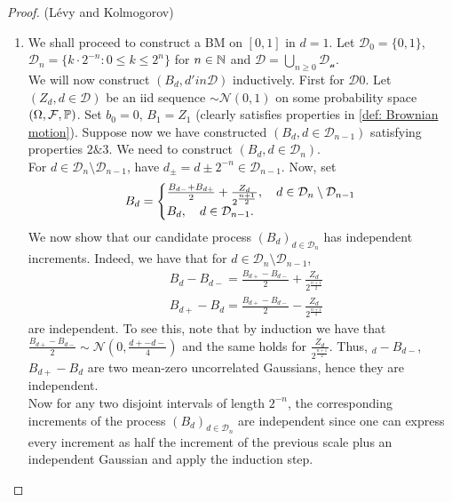 \documentclass{article}
\begin{document}
\begin{proof}{(L\'{e}vy and Kolmogorov)}

    \begin{enumerate}
	    \item We shall proceed to construct a BM on $ [0,1]$ in $ d = 1$. Let $ \mathcal{D}_{0} = \{0,1\}$, $ \mathcal{D}_{n} = \{k\cdot 2^{-n}: 0\leq k \leq 2^n\}$ for $ n\in \mathbb{N}$ and $ \mathcal{D} = \displaystyle\bigcup_{n\geq 0} \mathcal{D_{n}}$.\\ 

		    We will now construct $ (B_{d}, d'in \mathcal{D})$ inductively. First for $ \mathcal{D}0$. Let $ (Z_{d}, d\in \mathcal{D})$ be an iid sequence $ \sim \mathcal{N}(0,1)$ on some probability space $ (\Omega, \mathcal{F}, \mathbb{P})$. Set $ b_{0} = 0$, $ B_{1} = Z_{1}$ (clearly satisfies properties in \ref{def: Brownian motion}). Suppose now we have constructed $ (B_{d}, d\in \mathcal{D}_{n-1})$ satisfying properties $ 2 \& 3$. We need to construct $ (B_{d}, d\in \mathcal{D}_{n})$.\\ 

		    For $ d\in \mathcal{D}_{n}\setminus \mathcal{D}_{n-1}$, have $d_{\pm} = d\pm 2^{-n}\in \mathcal{D}_{n-1}$. Now, set
		    \[
	 B_{d} =   \left\lbrace
		    \begin{array}{@{}l@{}}
		       \frac{B_{d-}+B_{d+}}{2}+\frac{Z_{d}}{2^{\frac{n+1}{2}}}, \quad d\in \mathcal{D}_{n}\setminus \mathcal{D}_{n-1} \\
		        B_{d}, \quad d\in \mathcal{D}_{n-1}.
		    \end{array}\right.
		    \]
		   We now show that our candidate process $ (B_{d})_{d\in \mathcal{D}_{n}}$ has independent increments. Indeed, we have that for $ d\in \mathcal{D}_{n}\setminus \mathcal{D}_{n-1}$,
		   \[
			   \begin{array}{cc}
		       &B_{d}-B_{d-} = \frac{B_{d+}-B_{d-}}{2}+\frac{Z_{d}}{2^{\frac{n+1}{2}}}\\ 
		       &B_{d+}-B_{d} = \frac{B_{d+}-B_{d-}}{2}-\frac{Z_{d}}{2^{\frac{n+1}{2}}}
		   \end{array}		   
		   \]
		   are independent. To see this, note that by induction we have that $\frac{B_{d+}-B_{d-}}{2}\sim \mathcal{N}(0, \frac{d+-d-}{4})$ and the same holds for $ \frac{Z_{d}}{2^{\frac{n+1}{2}}}$. Thus, $ _{d}-B_{d-}$, $B_{d+}-B_{d}$ are two mean-zero uncorrelated Gaussians, hence they are independent.\\ 

		   Now for any two disjoint intervals of length $ 2^{-n}$, the corresponding increments of the process $ (B_{d})_{d\in \mathcal{D}_{n}}$ are independent since one can express every increment as half the increment of the previous scale plus an independent Gaussian and apply the induction step.\\ 


\end{enumerate}
\end{proof}
\end{document}
